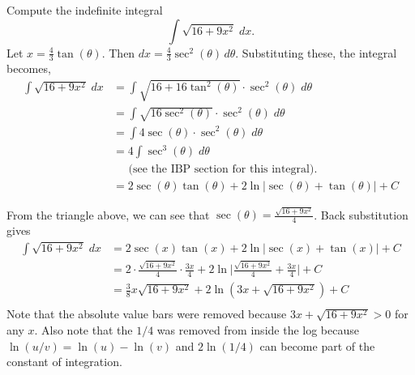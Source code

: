 \documentclass{ximera}
\begin{document}
\begin{example}[example 11]
Compute the indefinite integral
\[
\int \sqrt{16 + 9x^2} \; dx.
\]
Let $x = \frac43 \tan(\theta)$. Then $dx = \frac43 \sec^2(\theta) \, d\theta$.
Substituting these, the integral becomes,
\begin{align*}
\int \sqrt{16 + 9x^2} \; dx &= \int \sqrt{16+16\tan^2(\theta)} \cdot \sec^2(\theta) \; d\theta\\[6pt]
                            &= \int \sqrt{16\sec^2(\theta)} \cdot \sec^2(\theta) \; d\theta\\[6pt]
                            &= \int 4\sec(\theta) \cdot \sec^2(\theta) \; d\theta\\[6pt]
                            &= 4\int \sec^3(\theta) \; d\theta\\[6pt]
                            &\;\;\;\;\;\text{(see the IBP section for this integral).}\\[6pt]
                            &= 2 \sec(\theta) \tan(\theta) + 2 \ln|\sec(\theta) + \tan(\theta)| + C
\end{align*}
                            


\begin{image}
\end{image}





From the triangle above, we can see that $\sec(\theta) = \frac{\sqrt{16+9x^2}}{4 }$. Back substitution gives
\begin{align*}
\int \sqrt{16 + 9x^2} \; dx &= 2 \sec(x) \tan(x) + 2 \ln|\sec(x) + \tan(x)| + C\\
                            &=  2 \cdot\frac{\sqrt{16+9x^2}}{4 } \cdot \frac{3x}{4}  + 2 \ln\bigg|\frac{\sqrt{16+9x^2}}{4 } + \frac{3x}{4}\bigg| + C\\
                            &=   \frac38 x\sqrt{16+9x^2}  + 2 \ln\left(3x +  \sqrt{16+9x^2}\right) + C\\
\end{align*}
Note that the absolute value bars were removed because $3x +  \sqrt{16+9x^2} > 0$ for any $x$. Also note that the $1/4$ was removed from inside the log 
because $\ln(u/v) = \ln(u) - \ln(v)$ and $2\ln(1/4)$ can become part of the constant of integration.
\end{example}
\end{document}
